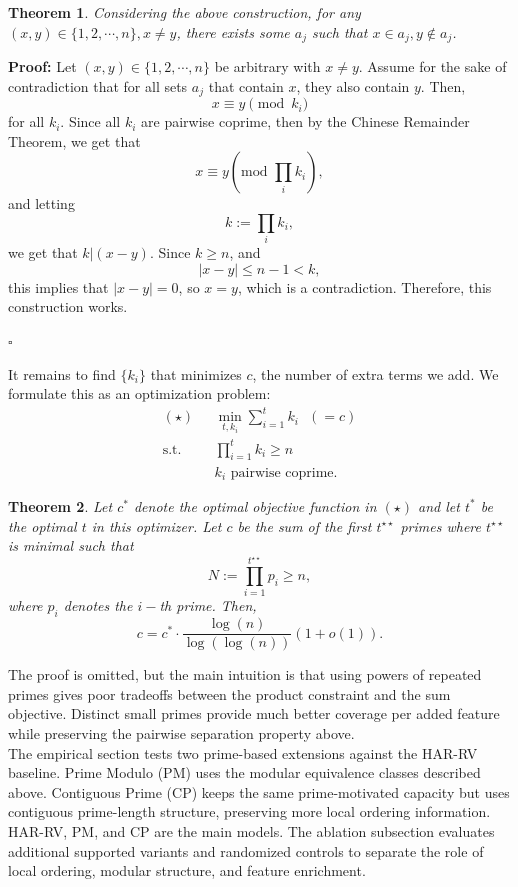 ﻿\documentclass[11pt,a4paper]{article}
\newtheorem{theorem}{Theorem}
\begin{document}
\begin{theorem}
    Considering the above construction, for any $(x, y) \in \{1, 2, \cdots, n\}, x\neq y$, there exists some $a_j$ such that $x \in a_j, y \notin a_j$.
\end{theorem}
\noindent \textbf{Proof: }Let $(x, y) \in \{1, 2, \cdots, n\}$ be arbitrary with $x \neq y$. Assume for the sake of contradiction that for all sets $a_j$ that contain $x$, they also contain $y$. Then, $$x \equiv y \pmod{k_i}$$ for all $k_i$. Since all $k_i$ are pairwise coprime, then by the Chinese Remainder Theorem, we get that $$x \equiv y \left(\text{mod }\displaystyle\prod_i k_i\right),$$ and letting $$k := \displaystyle\prod_i k_i,$$we get that $k | (x-y)$. Since $k \geq n$, and $$|x-y| \leq n-1 < k,$$ this implies that $|x-y| = 0$, so $x=y$, which is a contradiction. Therefore, this construction works.
\begin{flushright}
  $\square$
\end{flushright}
\vspace{0.3cm}
\noindent It remains to find $\{k_i\}$ that minimizes $c$, the number of extra terms we add. We formulate this as an optimization problem:
\vspace{0.3cm}
\begin{align*}
    (\star) & \text{ } \min_{t, k_i} \displaystyle\sum_{i=1}^t k_i \text{ }(= c)
    \\ \text{s.t.} & \text{ }\prod_{i=1}^t k_i \geq n
    \\ &\text{ $k_i$ pairwise coprime}.
\end{align*}
\vspace{0.3cm}
\begin{theorem}
    Let $c^*$ denote the optimal objective function in $(\star)$ and let $t^*$ be the optimal $t$ in this optimizer. Let $c$ be the sum of the first $t^{\star\star}$ primes where $t^{\star\star}$ is minimal such that $$N := \displaystyle\prod_{i=1}^{t^{\star\star}} p_i \geq n,$$where $p_i$ denotes the $i-$th prime. Then, $$c = c^* \cdot \frac{\log(n)}{\log(\log(n))}(1+o(1)).$$
\end{theorem}
\vspace{0.3cm}
\noindent The proof is omitted, but the main intuition is that using powers of repeated primes gives poor tradeoffs between the product constraint and the sum objective. Distinct small primes provide much better coverage per added feature while preserving the pairwise separation property above.
\vspace{0.3cm}
\\ The empirical section tests two prime-based extensions against the HAR-RV baseline. Prime Modulo (PM) uses the modular equivalence classes described above. Contiguous Prime (CP) keeps the same prime-motivated capacity but uses contiguous prime-length structure, preserving more local ordering information. HAR-RV, PM, and CP are the main models. The ablation subsection evaluates additional supported variants and randomized controls to separate the role of local ordering, modular structure, and feature enrichment.
\end{document}
